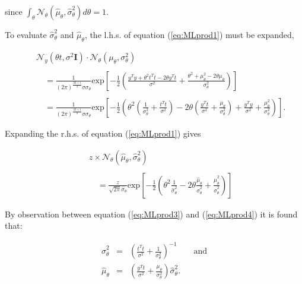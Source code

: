since $\int_\theta \mathcal{N}_\theta(\hat{\mu}_\theta,\hat{\sigma}^2_\theta) d\theta = 1$.

To evaluate $\hat{\sigma}^2_\theta$ and $\hat{\mu}_\theta$, the l.h.s. of equation (\ref{eq:MLprod1}) must be expanded,

\begin{eqnarray}\label{eq:MLprod3}
& & \mathcal{N}_y(\theta t,\sigma^2 \textbf{I})\cdot\mathcal{N}_\theta(\mu_\theta,\sigma^2_\theta) \\\nonumber{}\\\nonumber
& & \quad = \frac{1}{\left(2\pi\right)^{\frac{M+1}{2}} \sigma \sigma_\theta} \textrm{exp}\left[-\frac{1}{2}\left(\frac{y^Ty +\theta^2t^Tt-2\theta y^T t}{\sigma^2}+\frac{\theta^2 + \mu^2_\theta-2\theta\mu_\theta}{\sigma_\theta^2}\right)\right]\\\nonumber{}\\\nonumber
& & \quad = \frac{1}{\left(2\pi\right)^{\frac{M+1}{2}} \sigma \sigma_\theta} \textrm{exp}\left[-\frac{1}{2}\left(\theta^2 \left(\frac{1}{\sigma_\theta^2}+\frac{t^T t}{\sigma^2}\right) - 2\theta\left(\frac{y^T t}{\sigma^2}+\frac{\mu_\theta}{\sigma_\theta^2}\right) + \frac{y^Ty}{\sigma^2} +\frac{\mu_\theta^2}{\sigma_\theta^2}\right)\right].
\end{eqnarray}

Expanding the r.h.s. of equation (\ref{eq:MLprod1}) gives

\begin{eqnarray}\label{eq:MLprod4}
& & z \times \mathcal{N}_\theta(\hat{\mu}_\theta,\hat{\sigma}^2_\theta) \\\nonumber{}\\\nonumber
& & \quad = \frac{z}{\sqrt{2 \pi}\hat{\sigma}_\theta}\textrm{exp}\left[-\frac{1}{2}\left(\theta^2\frac{1}{\hat{\sigma}^2_\theta} - 2\theta\frac{\hat{\mu}_\theta}{\hat{\sigma}^2_\theta} + \frac{\hat{\mu}_\theta^2}{\hat{\sigma}^2_\theta}  \right)\right]
\end{eqnarray}

By observation between equation (\ref{eq:MLprod3}) and (\ref{eq:MLprod4}) it is found that:

\begin{eqnarray}
\label{eq:MLprod5}
\hat{\sigma}^2_\theta &=& \left(\frac{t^T t}{\sigma^2} + \frac{1}{\sigma_\theta^2}\right)^{-1} \qquad \textrm{and}\\\nonumber
\hat{\mu}_\theta &=& \left(\frac{y^T t}{\sigma^2} + \frac{\mu_\theta}{\sigma^2_\theta}\right)\hat{\sigma}^2_\theta.
\end{eqnarray}

